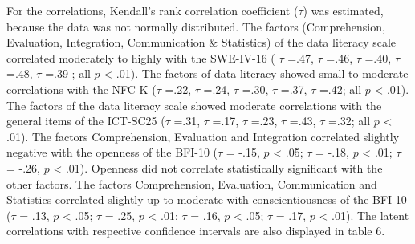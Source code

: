 \documentclass[
  12pt,
  a4paper,
  twoside]{article}
\begin{document}
For the correlations, Kendall's rank correlation coefficient (\(\tau\)) was estimated, because the data was not normally distributed. The factors (Comprehension, Evaluation, Integration, Communication \& Statistics) of the data literacy scale correlated moderately to highly with the SWE-IV-16 ( \(\tau\) =.47, \(\tau\) =.46, \(\tau\) =.40, \(\tau\) =.48, \(\tau\) =.39 ; all \(p\) \textless{} .01). The factors of data literacy showed small to moderate correlations with the NFC-K (\(\tau\) =.22, \(\tau\) =.24, \(\tau\) =.30, \(\tau\) =.37, \(\tau\) =.42; all \(p\) \textless{} .01). The factors of the data literacy scale showed moderate correlations with the general items of the ICT-SC25 (\(\tau\) =.31, \(\tau\) =.17, \(\tau\) =.23, \(\tau\) =.43, \(\tau\) =.32; all \(p\) \textless{} .01). The factors Comprehension, Evaluation and Integration correlated slightly negative with the openness of the BFI-10 (\(\tau\) = -.15, \(p\) \textless{} .05; \(\tau\) = -.18, \(p\) \textless{} .01; \(\tau\) = -.26, \(p\) \textless{} .01). Openness did not correlate statistically significant with the other factors. The factors Comprehension, Evaluation, Communication and Statistics correlated slightly up to moderate with conscientiousness of the BFI-10 (\(\tau\) = .13, \(p\) \textless{} .05; \(\tau\) = .25, \(p\) \textless{} .01; \(\tau\) = .16, \(p\) \textless{} .05; \(\tau\) = .17, \(p\) \textless{} .01). The latent correlations with respective confidence intervals are also displayed in table 6.
\end{document}
